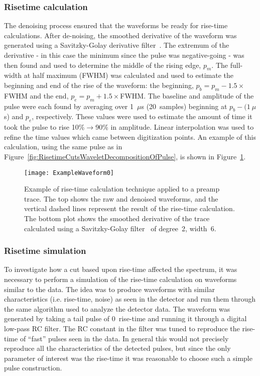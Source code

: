 			\subsubsection{Risetime calculation}
			\label{sec:RisetimeCalculation}
	The denoising process ensured that the waveforms be ready for rise-time calculations.  After de-noising, the smoothed derivative of the waveform was generated using a Savitzky-Golay derivative filter~\cite{Sav64aa}.  The extremum of the derivative - in this case the minimum since the pulse was negative-going - was then found and used to determine the middle of the rising edge, $p_{m}$.  The full-width at half maximum (FWHM) was calculated and used to estimate the beginning and end of the rise of the waveform: the beginning, $p_{b} = p_{m} - 1.5\times$FWHM and the end, $p_{e} = p_{m} + 1.5\times$FWHM.  The baseline and amplitude of the pulse were each found by averaging over 1~$\mu$s (20~samples) beginning at $p_{b} - (1~\mu$s) and $p_{e}$, respectively.  These values were used to estimate the amount of time it took the pulse to rise 10\%$\to$90\% in amplitude.  Linear interpolation was used to refine the time values which came between digitization points.  An example of this calculation, using the same pulse as in Figure~\ref{fig:RisetimeCutsWaveletDecompositionOfPulse}, is shown in Figure~\ref{fig:RisetimeCutsExampleOfPulse}.  
		
				\begin{figure}
					\centering
					\texttt{[image: ExampleWaveform0]}
					\caption[Example of rise-time calculation technique applied to a preamp trace]
					{Example of rise-time calculation technique applied to a preamp trace.  
					The top shows the raw and denoised waveforms, and the vertical dashed lines represent the result 
					of the rise-time calculation.  The bottom plot shows the smoothed derivative of the trace calculated 
					using a Savitzky-Golay filter~\cite{Sav64aa} of degree~2, width~6.}
					\label{fig:RisetimeCutsExampleOfPulse}
				\end{figure}					

			\subsubsection{Risetime simulation}
			\label{sec:RisetimeSimulation}
	
	To investigate how a cut based upon rise-time affected the spectrum, it was necessary to perform a simulation of the rise-time calculation on waveforms similar to the data.  The idea was to produce waveforms with similar characteristics (i.e. rise-time, noise) as seen in the detector and run them through the same algorithm used to analyze the detector data.  The waveform was generated by taking a tail pulse of 0~rise-time and running it through a digital low-pass RC filter.  The RC constant in the filter was tuned to reproduce the rise-time of ``fast'' pulses seen in the data.  In general this would not precisely reproduce all the characteristics of the detected pulses, but since the only parameter of interest was the rise-time it was reasonable to choose such a simple pulse construction.  
	
